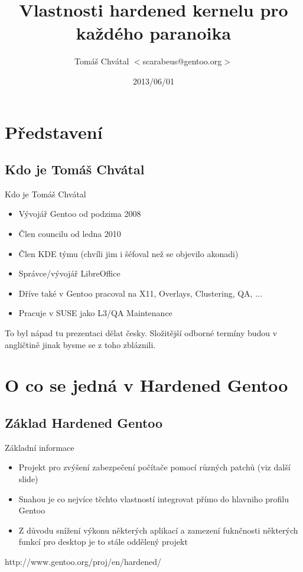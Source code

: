 \documentclass{beamer}
\title{Vlastnosti hardened kernelu pro každého paranoika}
\author[Tomáš Chvátal]{Tomáš Chvátal $<$scarabeus@gentoo.org$>$}
\date{2013/06/01}
\begin{document}
\frame{\titlepage}
\section{Představení}

\subsection{Kdo je Tomáš Chvátal}

\begin{frame}{Kdo je Tomáš Chvátal}
	\begin{itemize}
		\item Vývojář Gentoo od podzima 2008
		\item Člen councilu od ledna 2010
		\item Člen KDE týmu (chvíli jim i šéfoval než se objevilo akonadi)
		\item Správce/vývojář LibreOffice
		\item Dříve také v Gentoo pracoval na X11, Overlays, Clustering, QA, ...
		\item Pracuje v SUSE jako L3/QA Maintenance
	\end{itemize}
	\begin{center}To byl nápad tu prezentaci dělat česky. Složitější odborné termíny budou v angličtině jinak bysme se z toho zbláznili.\end{center}
\end{frame}
\section{O co se jedná v Hardened Gentoo}

\subsection{Základ Hardened Gentoo}

\begin{frame}{Základní informace}
	\begin{itemize}
		\item Projekt pro zvýšení zabezpečení počítače pomocí různých patchů (viz další slide)
		\item Snahou je co nejvíce těchto vlastností integrovat přímo do hlavniho profilu Gentoo
		\item Z důvodu snížení výkonu některých aplikací a zamezení fuknčnosti některých funkcí pro desktop je to stále oddělený projekt
	\end{itemize}
	\begin{center}http://www.gentoo.org/proj/en/hardened/\end{center}
\end{frame}
\end{document}
